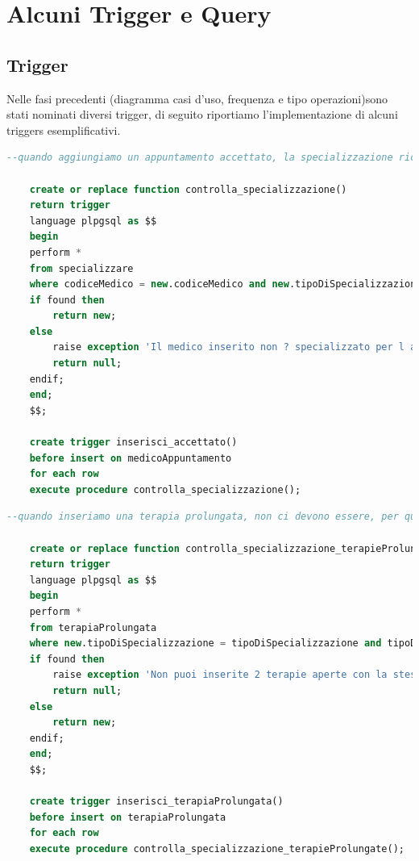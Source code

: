 \documentclass[11pt]{article}
\begin{document}
\section{Alcuni Trigger e Query}
\subsection{Trigger}
Nelle fasi precedenti (diagramma casi d'uso, frequenza e tipo operazioni)sono stati nominati diversi trigger, di seguito riportiamo l'implementazione di alcuni triggers esemplificativi.
\\
\label{trig:trigger1}
\begin{lstlisting}[language=SQL]
    --quando aggiungiamo un appuntamento accettato, la specializzazione richiesta dalla terapia deve essere tra le specializzazioni del medico che fa l'appuntamento

    create or replace function controlla_specializzazione()
    return trigger
    language plpgsql as $$
    begin
    perform *
    from specializzare
    where codiceMedico = new.codiceMedico and new.tipoDiSpecializzazione = tipoDiSpecializzazione;
    if found then
        return new;
    else
        raise exception 'Il medico inserito non ? specializzato per l appuntamento';
        return null;
    endif;
    end;
    $$;
    
    create trigger inserisci_accettato()
    before insert on medicoAppuntamento
    for each row
    execute procedure controlla_specializzazione();
\end{lstlisting}
\begin{lstlisting}[language=SQL]
    --quando inseriamo una terapia prolungata, non ci devono essere, per quel paziente, terapie prolungate aperte con lo stesso tipo di specializzazione

    create or replace function controlla_specializzazione_terapieProlungate()
    return trigger
    language plpgsql as $$
    begin
    perform *
    from terapiaProlungata
    where new.tipoDiSpecializzazione = tipoDiSpecializzazione and tipoDiTerapia = 'aperta' and new.cf = cf and new.tipoDiTerapia = 'aperto';
    if found then
        raise exception 'Non puoi inserite 2 terapie aperte con la stessa specializzazione';
        return null;
    else
        return new;
    endif;
    end;
    $$;
    
    create trigger inserisci_terapiaProlungata()
    before insert on terapiaProlungata
    for each row
    execute procedure controlla_specializzazione_terapieProlungate();
\end{lstlisting}
\end{document}
